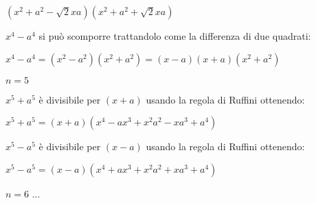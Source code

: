 \begin{itemize*}
\begin{itemize*}
   \(\left(x^2+a^2-\sqrt{2}xa\right)\left(x^2+a^2+\sqrt{2}xa\right)\)
   
  \item \(x^4-a^4\) si può scomporre trattandolo come la differenza di due 
   quadrati:
   
   \(x^4-a^4 = (x^2-a^2)(x^2+a^2) = (x-a)(x+a)(x^2+a^2) \)
 \end{itemize*}

 \item \(n=5\)
 \begin{itemize*}
  \item \(x^5+a^5\) è divisibile per \((x+a)\) usando la regola di Ruffini
   ottenendo: 
   
   \(x^5+a^5=(x+a)(x^4-ax^3+x^2a^2-xa^3+a^4)\)
   
  \item \(x^5-a^5\) è divisibile per \((x-a)\) usando la regola di Ruffini
   ottenendo: 
   
   \(x^5-a^5=(x-a)(x^4+ax^3+x^2a^2+xa^3+a^4)\)
   
 \end{itemize*}

 \item \(n=6\) ...
 
\end{itemize*}

%  
% 
% 
% 
%  
% 
% 
% 
% 
% 

